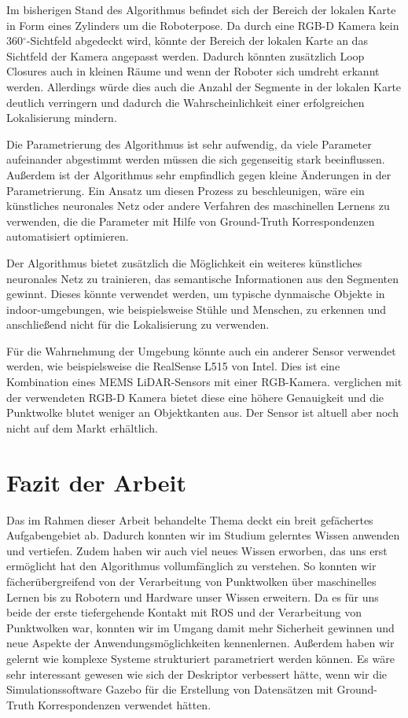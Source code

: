 Im bisherigen Stand des Algorithmus befindet sich der Bereich der lokalen Karte in Form eines Zylinders um die Roboterpose. Da durch eine RGB-D Kamera kein 360$^{\circ}$-Sichtfeld abgedeckt wird, könnte der Bereich der lokalen Karte an das Sichtfeld der Kamera angepasst werden. Dadurch könnten zusätzlich Loop Closures auch in kleinen Räume und wenn der Roboter sich umdreht erkannt werden. Allerdings würde dies auch die Anzahl der Segmente in der lokalen Karte deutlich verringern und dadurch die Wahrscheinlichkeit einer erfolgreichen Lokalisierung mindern. 

Die Parametrierung des Algorithmus ist sehr aufwendig, da viele Parameter aufeinander abgestimmt werden müssen die sich gegenseitig stark beeinflussen. Außerdem ist der Algorithmus sehr empfindlich gegen kleine Änderungen in der Parametrierung. Ein Ansatz um diesen Prozess zu beschleunigen, wäre ein künstliches neuronales Netz oder andere Verfahren des maschinellen Lernens zu verwenden, die die Parameter mit Hilfe von Ground-Truth Korrespondenzen automatisiert optimieren. 

Der Algorithmus bietet zusätzlich die Möglichkeit ein weiteres künstliches neuronales Netz zu trainieren, das semantische Informationen aus den Segmenten gewinnt. Dieses könnte verwendet werden, um typische dynmaische Objekte  in indoor-umgebungen, wie beispielsweise Stühle und Menschen, zu erkennen und anschließend nicht für die Lokalisierung zu verwenden. 

Für die Wahrnehmung der Umgebung könnte auch ein anderer Sensor verwendet werden, wie beispielsweise die RealSense L515 von Intel. Dies ist eine Kombination eines  MEMS LiDAR-Sensors mit einer RGB-Kamera. verglichen mit der verwendeten RGB-D Kamera bietet diese eine höhere Genauigkeit und die Punktwolke blutet weniger an Objektkanten aus. Der Sensor ist altuell aber noch nicht  auf dem Markt erhältlich. 

\section[Fazit der Arbeit (Kopp, Schmelzer)]{Fazit der Arbeit}

Das im Rahmen dieser Arbeit behandelte Thema deckt ein breit gefächertes Aufgabengebiet ab. Dadurch konnten wir im Studium gelerntes Wissen anwenden und vertiefen. Zudem haben wir auch viel neues Wissen erworben, das uns erst ermöglicht hat den Algorithmus vollumfänglich zu verstehen. So konnten wir fächerübergreifend von der Verarbeitung von Punktwolken über maschinelles Lernen bis zu Robotern und Hardware unser Wissen erweitern. Da es für uns beide der erste tiefergehende Kontakt mit ROS und der Verarbeitung von Punktwolken war, konnten wir im Umgang damit mehr Sicherheit gewinnen und neue Aspekte der Anwendungsmöglichkeiten kennenlernen. 
Außerdem haben wir gelernt wie komplexe Systeme strukturiert parametriert werden können. Es wäre sehr interessant gewesen wie sich der Deskriptor verbessert hätte, wenn wir die Simulationssoftware Gazebo für die Erstellung von Datensätzen mit Ground-Truth Korrespondenzen verwendet hätten. 
